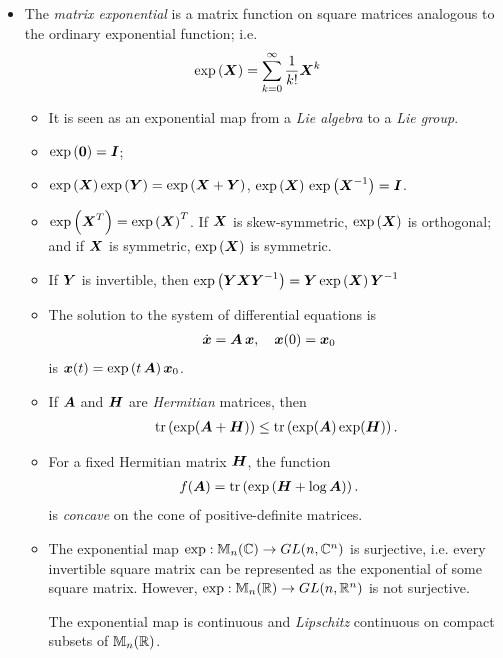 \documentclass[11pt]{article}
\begin{document}
\begin{itemize}
\item The \emph{matrix exponential} is a matrix function on square matrices analogous to the ordinary exponential function; i.e. 
\begin{align*}
\exp\left(\boldsymbol{X}\right) &= \sum_{k=0}^{\infty}\frac{1}{k!}\boldsymbol{X}^{k}
\end{align*}
\begin{itemize}
\item It is seen as an exponential map from a \emph{Lie algebra} to a \emph{Lie group}. 
\item $\exp\left(\boldsymbol{0}\right) = \boldsymbol{I}$; 
\item $\exp\left(\boldsymbol{X}\right)\exp\left(\boldsymbol{Y}\right) = \exp\left(\boldsymbol{X}+\boldsymbol{Y}\right)$, $\exp\left(\boldsymbol{X}\right)\,\exp\left(\boldsymbol{X}^{-1}\right) = \boldsymbol{I}$.
\item $\exp\left(\boldsymbol{X}^{T}\right) =\exp\left(\boldsymbol{X}\right)^{T}$. If $\boldsymbol{X}$ is skew-symmetric, $\exp\left(\boldsymbol{X}\right)$ is orthogonal; and if  $\boldsymbol{X}$ is symmetric, $\exp\left(\boldsymbol{X}\right)$ is symmetric.
\item If $\boldsymbol{Y}$ is invertible, then $\exp\left(\boldsymbol{Y}\boldsymbol{X}\boldsymbol{Y}^{-1}\right) = \boldsymbol{Y}\exp\left(\boldsymbol{X}\right)\boldsymbol{Y}^{-1}$
\item The solution to the system of differential equations is
\begin{align*}
\dot{\boldsymbol{x}} &= \boldsymbol{A\,x},\quad \boldsymbol{x}(0) = \boldsymbol{x}_{0}
\end{align*}
is $\boldsymbol{x}(t) = \exp\left(t\,\boldsymbol{A}\right)\boldsymbol{x}_{0}$.

\item  If $\boldsymbol{A}$ and $\boldsymbol{H}$ are \emph{Hermitian} matrices, then
\begin{align*}
\mathrm{tr}\left(\exp(\boldsymbol{A}+\boldsymbol{H}) \right) \leq \mathrm{tr}\left(\exp(\boldsymbol{A})\exp(\boldsymbol{H}) \right). 
\end{align*}

\item For a fixed Hermitian matrix $\boldsymbol{H}$, the function
\begin{align*}
f(\boldsymbol{A}) &= \mathrm{tr}\left(\exp\left(\boldsymbol{H} + \log\boldsymbol{A}\right) \right).
\end{align*}
is \emph{concave} on the cone of positive-definite matrices.

\item The exponential map $\exp: {\mathbb M}_{n}({\mathbb C}) \rightarrow GL(n, {\mathbb C}^{n})$ is surjective, i.e. every invertible square matrix can be represented as the exponential of some square matrix. However, $\exp: {\mathbb M}_{n}({\mathbb R}) \rightarrow GL(n, {\mathbb R}^{n})$ is not surjective.

The exponential map is continuous and \emph{Lipschitz} continuous on compact subsets of ${\mathbb M}_{n}({\mathbb R})$. 


\end{itemize}
\end{itemize}
\end{document}
